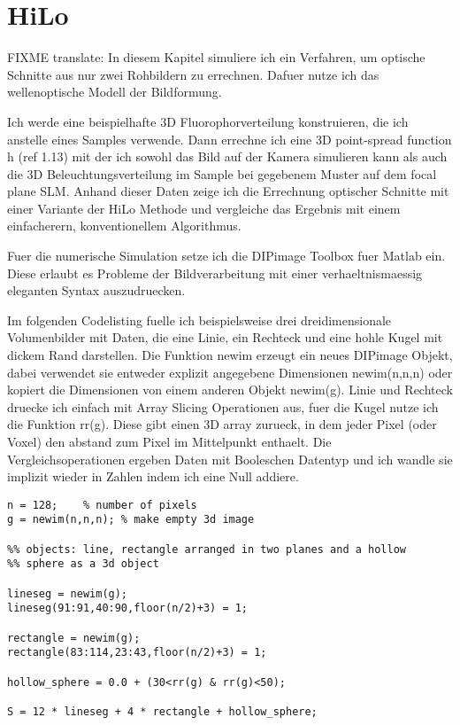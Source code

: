 \section{HiLo}
FIXME translate:
In diesem Kapitel simuliere ich ein Verfahren, um optische Schnitte
aus nur zwei Rohbildern zu errechnen. Dafuer nutze ich das
wellenoptische Modell der Bildformung.

Ich werde eine beispielhafte 3D Fluorophorverteilung konstruieren,
die ich anstelle eines Samples verwende. Dann errechne ich eine 3D
point-spread function h (ref 1.13) mit der ich sowohl das Bild auf
der Kamera simulieren kann als auch die 3D Beleuchtungsverteilung im
Sample bei gegebenem Muster auf dem focal plane SLM. Anhand dieser
Daten zeige ich die Errechnung optischer Schnitte mit einer Variante
der HiLo Methode und vergleiche das Ergebnis mit einem einfacherern,
konventionellem Algorithmus.

Fuer die numerische Simulation setze ich die DIPimage Toolbox fuer
Matlab ein. Diese erlaubt es Probleme der Bildverarbeitung mit einer
verhaeltnismaessig eleganten Syntax auszudruecken. 

 Im folgenden Codelisting fuelle ich
beispielsweise drei dreidimensionale Volumenbilder mit Daten, die eine
Linie, ein Rechteck und eine hohle Kugel mit dickem Rand
darstellen. Die Funktion newim erzeugt ein neues DIPimage Objekt,
dabei verwendet sie entweder explizit angegebene Dimensionen
newim(n,n,n) oder kopiert die Dimensionen von einem anderen Objekt
newim(g). Linie und Rechteck druecke ich einfach mit Array Slicing
Operationen aus, fuer die Kugel nutze ich die Funktion rr(g). Diese
gibt einen 3D array zurueck, in dem jeder Pixel (oder Voxel) den
abstand zum Pixel im Mittelpunkt enthaelt. Die Vergleichsoperationen
ergeben Daten mit Booleschen Datentyp und ich wandle sie implizit
wieder in Zahlen indem ich eine Null addiere.

\begin{lstlisting}[style=mymatlab]
n = 128;    % number of pixels 
g = newim(n,n,n); % make empty 3d image

%% objects: line, rectangle arranged in two planes and a hollow
%% sphere as a 3d object

lineseg = newim(g);
lineseg(91:91,40:90,floor(n/2)+3) = 1;

rectangle = newim(g);
rectangle(83:114,23:43,floor(n/2)+3) = 1;

hollow_sphere = 0.0 + (30<rr(g) & rr(g)<50); 

S = 12 * lineseg + 4 * rectangle + hollow_sphere;
\end{lstlisting}

